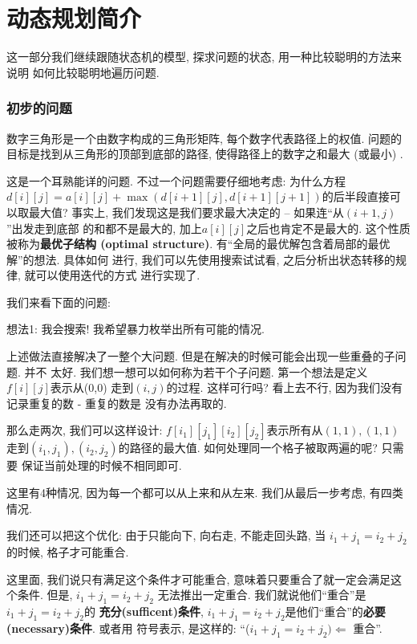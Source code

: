 \part{动态规划简介}

这一部分我们继续跟随状态机的模型, 探求问题的状态, 用一种比较聪明的方法来说明
如何比较聪明地遍历问题. 

\section{初步的问题}

 数字三角形是一个由数字构成的三角形矩阵, 
每个数字代表路径上的权值. 问题的目标是找到从三角形的顶部到底部的路径, 
使得路径上的数字之和最大 (或最小) . 

这是一个耳熟能详的问题. 不过一个问题需要仔细地考虑: 为什么方程
$d[i][j]=a[i][j]+\max(d[i+1][j], d[i+1][j+1])$的后半段直接可以取最大值? 
事实上, 我们发现这是我们要求最大决定的 -- 如果连``从$(i+1,j)$''出发走到底部
的和都不是最大的, 加上$a[i][j]$之后也肯定不是最大的. 这个性质被称为\textbf{最优子结构
(optimal structure)}. 有``全局的最优解包含着局部的最优解''的想法. 具体如何
进行, 我们可以先使用搜索试试看, 之后分析出状态转移的规律, 就可以使用迭代的方式
进行实现了. 

我们来看下面的问题: 

 想法1: 我会搜索! 我希望暴力枚举出所有可能的情况. 

上述做法直接解决了一整个大问题. 但是在解决的时候可能会出现一些重叠的子问题. 并不
太好. 我们想一想可以如何称为若干个子问题. 第一个想法是定义$f[i][j]$表示从(0,0)
走到$(i,j)$的过程. 这样可行吗? 看上去不行, 因为我们没有记录重复的数 - 重复的数是
没有办法再取的. 

那么走两次, 我们可以这样设计: $f[i_1][j_1][i_2][j_2]$表示所有从$(1,1),(1,1)$
走到$(i_1,j_1),(i_2,j_2)$的路径的最大值. 如何处理同一个格子被取两遍的呢? 只需要
保证当前处理的时候不相同即可. 

这里有4种情况, 因为每一个都可以从上来和从左来. 我们从最后一步考虑, 有四类情况. 

我们还可以把这个优化: 由于只能向下, 向右走, 不能走回头路, 当
$i_1+j_1 = i_2 +j_2$的时候, 格子才可能重合. 

 这里面, 我们说只有满足这个条件才可能重合, 
意味着只要重合了就一定会满足这个条件. 但是, $i_1+j_1 = i_2 +j_2$
无法推出一定重合. 我们就说他们``重合''是$i_1+j_1 = i_2 +j_2$的
\textbf{充分(sufficent)条件}, 
$i_1+j_1 = i_2 +j_2$是他们``重合''的\textbf{必要(necessary)条件}. 或者用
符号表示, 是这样的: ``($i_1+j_1 = i_2 +j_2)\Leftarrow$ 重合''. 

